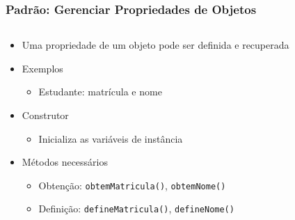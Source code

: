 \documentclass[xcolor={dvipsnames,table},aspectratio=169]{beamer}
\begin{document}
\begin{frame}[fragile]\frametitle{Padrão: Gerenciar Propriedades de Objetos}
\begin{columns}[T]
	\begin{column}{0.5\linewidth}
\begin{itemize}
	\item Uma propriedade de um objeto pode ser definida e recuperada
	\item Exemplos
	\begin{itemize}
		\item Estudante: matrícula e nome
	\end{itemize}
	\item Construtor
	\begin{itemize}
		\item Inicializa as variáveis de instância
	\end{itemize}
	\item Métodos necessários
	\begin{itemize}
		\item Obtenção: \texttt{obtemMatricula()}, \texttt{obtemNome()}
		\item Definição: \texttt{defineMatricula()}, \texttt{defineNome()}
	\end{itemize}
\end{itemize}
	\end{column}
	\begin{column}{0.5\linewidth}
{\tiny\inputminted[bgcolor=cyan!10]{java}{src/estudante/Estudante.java}}
	\end{column}
\end{columns}
\end{frame}
\end{document}
